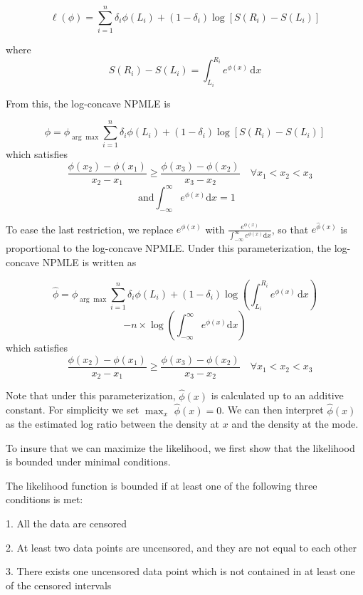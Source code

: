 	\[\ell(\phi) = \displaystyle \sum_{i = 1}^n \delta_i \phi(L_i)   + (1 - \delta_i) \log \left[ S(R_i) - S(L_i) \right]
	\]
	
	where 
	\[
	S(R_i)  - S(L_i) = \int_{L_i}^{R_i} e^ { \phi(x) } \,\mathrm{d}x  
	\]
	
	From this, the log-concave NPMLE is 
	
	\[ \hat \phi ={\phi}_{\arg \max}  \displaystyle \sum_{i = 1}^n \delta_i \phi(L_i)   + (1 - \delta_i) \log \left[ S(R_i) - S(L_i) \right] 
	\]
	which satisfies 
	\[
	 \quad \frac{ \phi(x_2) - \phi(x_1)} {x_2 - x_1} \geq \frac{ \phi(x_3) - \phi(x_2)} {x_3 - x_2} \quad \forall x_1 < x_2 < x_3 
	 \]
	 \[ 
	 \textrm{ and} \int_{-\infty}^{\infty} e^{\phi (x) } \mathrm{d}x = 1
	\]

	To ease the last restriction, we replace $e^{\phi(x)}$ with $\frac{e^{\phi(x)} } { \int_{-\infty}^{\infty}  e^{\phi(x)} \mathrm{d}x}$, so that $e^{\hat \phi(x)}$ is proportional to the log-concave NPMLE. Under this parameterization, the log-concave NPMLE is written as 

	\[ \hat \phi ={\phi}_{\arg \max} \displaystyle \sum_{i = 1}^n \delta_i \phi(L_i)   + (1 - \delta_i) \log \left( \int_{L_i}^{R_i} e^ { \phi(x) } \,\mathrm{d}x \right) \]
	\[
	- n \times \log \left(  \int_{-\infty}^{\infty} e^ { \phi(x) } \mathrm{d}x \right) 
	\]
	which satisfies
	\[
	 \quad \frac{ \phi(x_2) - \phi(x_1)} {x_2 - x_1} \geq \frac{ \phi(x_3) - \phi(x_2)} {x_3 - x_2}\quad \forall x_1 < x_2 < x_3 
	 \]
	
	Note that under this parameterization, $\hat \phi(x)$ is calculated up to an additive constant. For simplicity we set $\max_x $ $\hat \phi(x) = 0$. We can then interpret $\hat \phi(x)$ as the estimated log ratio between the density at $x$ and the density at the mode.

	To insure that we can maximize the likelihood, we first show that the likelihood is bounded under minimal conditions.	
	
	\begin{thm}
	\label{thm1}
	The likelihood function is bounded if at least one of the following three conditions is met:
	
	1. All the data are censored
	
	2. At least two data points are uncensored, and they are not equal to each other
	
	3. There exists one uncensored data point which is not contained in at least one of the censored intervals
	
	
	\end{thm}
	
